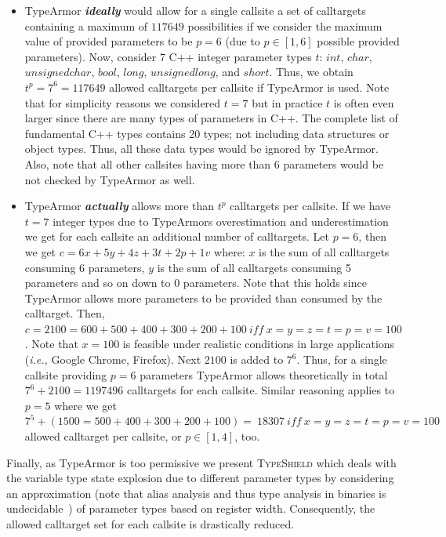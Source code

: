 \begin{itemize}[leftmargin=.12in]
\item TypeArmor \textbf{\textit{ideally}} would allow for a single callsite a set of calltargets containing a maximum of $117649$ possibilities if we consider the maximum value of provided parameters to be $p=6$ (due to $p \in [1, 6]$ possible provided parameters). Now, consider 7 C++ integer parameter types $t$: $int$, $char$, $unsigned char$, $bool$, $long$, $unsigned long$, and $short$. Thus, we obtain $t^{p}=7^{6}=117649$ allowed calltargets per callsite if TypeArmor is used. Note that for simplicity reasons we considered $t=7$ but in practice $t$ is often even larger since there are many types of parameters in C++. The complete list of fundamental C++ types contains 20 types; not including data structures or object types. Thus, all these data types would be ignored by TypeArmor. Also, note that all other callsites having more than 6 parameters would be not checked by TypeArmor as well.

\item TypeArmor \textbf{\textit{actually}} allows more than $t^{p}$ calltargets per callsite. If we have $t=7$ integer types due to TypeArmors overestimation and underestimation we get for each callsite an additional number of calltargets. Let $p=6$, then we get $c = 6x + 5y+ 4z + 3t + 2p + 1v$ where:
$x$ is the sum of all calltargets consuming 6 parameters, 
$y$ is the sum of all calltargets consuming 5 parameters 
and so on down to 0 parameters. Note that this holds since TypeArmor allows more parameters to be provided than consumed by the calltarget.
Then, $c = 2100 = 600 + 500 + 400 + 300 + 200 + 100 \ iff \ x=y=z=t=p=v=100$. 
Note that $x=100$ is feasible under realistic conditions in large applications (\textit{i.e.,} Google Chrome, Firefox). 
Next $2100$ is added to $7^{6}$. Thus, for a single callsite providing $p=6$ parameters TypeArmor allows theoretically in 
total $7^{6} + 2100 = 1197496$ calltargets for each callsite.
Similar reasoning applies to $p=5$ where we get $7^{5} + (1500 = 500 + 400 + 300 + 200 + 100) = \ 18307 \ iff \ x=y=z=t=p=v=100$ 
allowed calltarget per callsite, or $p \in [1, 4]$, too.
\end{itemize}

Finally, as TypeArmor is too permissive we present \textsc{TypeShield} which deals with the variable type state explosion due to different parameter types by considering an approximation (note that alias analysis and thus type analysis in binaries is undecidable~\cite{alias:undecidable}) of parameter types based on register width. Consequently, the allowed calltarget set for each callsite is drastically reduced.

